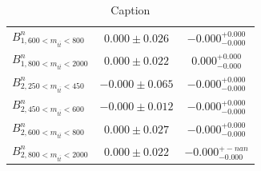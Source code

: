 \begin{table}[htb]
\begin{tabular}{l | c c}
$B^{n}_{1, 600 < m_{t\bar{t}} < 800}$ & $0.000 \pm 0.026$ & $-0.000^{+0.000}_{-0.000}$  \\
$B^{n}_{1, 800 < m_{t\bar{t}} < 2000}$ & $0.000 \pm 0.022$ & $0.000^{+0.000}_{-0.000}$  \\
$B^{n}_{2, 250 < m_{t\bar{t}} < 450}$ & $-0.000 \pm 0.065$ & $-0.000^{+0.000}_{-0.000}$  \\
$B^{n}_{2, 450 < m_{t\bar{t}} < 600}$ & $-0.000 \pm 0.012$ & $-0.000^{+0.000}_{-0.000}$  \\
$B^{n}_{2, 600 < m_{t\bar{t}} < 800}$ & $0.000 \pm 0.027$ & $-0.000^{+0.000}_{-0.000}$  \\
$B^{n}_{2, 800 < m_{t\bar{t}} < 2000}$ & $0.000 \pm 0.022$ & $-0.000^{+-nan}_{-0.000}$  \\
\hline
\end{tabular}
    \caption{Caption}
    \label{tab:Extracted_Coefficients_2D_Polarizations}
\end{table}


